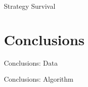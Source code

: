 \documentclass{beamer}
\begin{document}
\begin{frame}{Strategy Survival}
    
\end{frame}


\section{Conclusions}
\begin{frame}{Conclusions: Data}
    
\end{frame}

\begin{frame}{Conclusions: Algorithm}
    
\end{frame}
\end{document}
